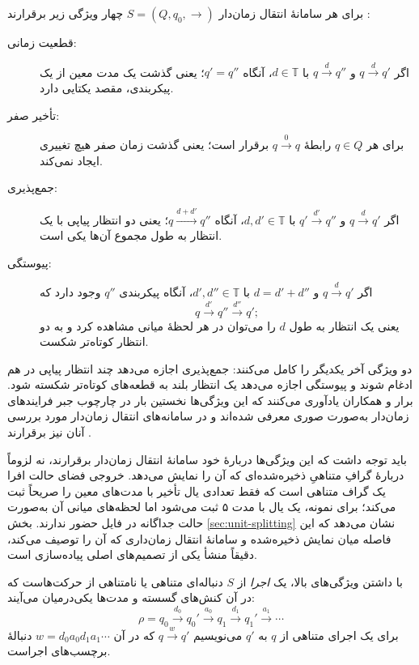 \begin{definition}
\label{def:tts-properties}
برای هر سامانهٔ انتقال زمان‌دار $S=(Q,q_0,\rightarrow)$ چهار ویژگی زیر برقرارند \cite{BerardEtAl2008}:
\begin{description}
\item[قطعیت زمانی:] اگر $q\xrightarrow{d}q'$ و $q\xrightarrow{d}q''$ با $d\in\mathbb{T}$، آنگاه $q'=q''$؛ یعنی گذشت یک مدت معین از یک پیکربندی، مقصد یکتایی دارد.
\item[تأخیر صفر:] برای هر $q\in Q$ رابطهٔ $q\xrightarrow{0}q$ برقرار است؛ یعنی گذشت زمان صفر هیچ تغییری ایجاد نمی‌کند.
\item[جمع‌پذیری:] اگر $q\xrightarrow{d}q'$ و $q'\xrightarrow{d'}q''$ با $d,d'\in\mathbb{T}$، آنگاه $q\xrightarrow{d+d'}q''$؛ یعنی دو انتظار پیاپی با یک انتظار به طول مجموع آن‌ها یکی است.
\item[پیوستگی:] اگر $q\xrightarrow{d}q'$ و $d=d'+d''$ با $d',d''\in\mathbb{T}$، آنگاه پیکربندی $q''$ وجود دارد که
\[
q\xrightarrow{d'}q''\xrightarrow{d''}q';
\]
یعنی یک انتظار به طول $d$ را می‌توان در هر لحظهٔ میانی مشاهده کرد و به دو انتظار کوتاه‌تر شکست.
\end{description}
\end{definition}

دو ویژگی آخر یکدیگر را کامل می‌کنند: جمع‌پذیری اجازه می‌دهد چند انتظار پیاپی در هم ادغام شوند و پیوستگی اجازه می‌دهد یک انتظار بلند به قطعه‌های کوتاه‌تر شکسته شود. برار و همکاران یادآوری می‌کنند که این ویژگی‌ها نخستین بار در چارچوب جبر فرایندهای زمان‌دار به‌صورت صوری معرفی شده‌اند و در سامانه‌های انتقال زمان‌دار مورد بررسی آنان نیز برقرارند \cite{BerardEtAl2008}.

باید توجه داشت که این ویژگی‌ها دربارهٔ خود سامانهٔ انتقال زمان‌دار برقرارند، نه لزوماً دربارهٔ گرافِ متناهیِ ذخیره‌شده‌ای که آن را نمایش می‌دهد. خروجی فضای حالت افرا یک گراف متناهی است که فقط تعدادی یال تأخیر با مدت‌های معین را صریحاً ثبت می‌کند؛ برای نمونه، یک یال با مدت ۵ ثبت می‌شود اما لحظه‌های میانی آن به‌صورت حالت جداگانه در فایل حضور ندارند. بخش \ref{sec:unit-splitting} نشان می‌دهد که این فاصله میان نمایش ذخیره‌شده و سامانهٔ انتقال زمان‌داری که آن را توصیف می‌کند، دقیقاً منشأ یکی از تصمیم‌های اصلی پیاده‌سازی است.

با داشتن ویژگی‌های بالا، یک \emph{اجرا} از $S$ دنباله‌ای متناهی یا نامتناهی از حرکت‌هاست که در آن کنش‌های گسسته و مدت‌ها یکی‌درمیان می‌آیند:
\[
\rho=q_0\xrightarrow{d_0}q_0'\xrightarrow{a_0}q_1\xrightarrow{d_1}q_1'
\xrightarrow{a_1}\cdots
\]
برای یک اجرای متناهی از $q$ به $q'$ می‌نویسیم $q\xrightarrow{w}q'$ که در آن $w=d_0a_0d_1a_1\cdots$ دنبالهٔ برچسب‌های اجراست.

